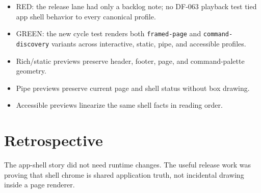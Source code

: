 \begin{itemize}
\tightlist
\item
  RED: the release lane had only a backlog note; no DF-063 playback test tied app shell behavior to every canonical profile.
\item
  GREEN: the new cycle test renders both \texttt{f\allowbreak{}r\allowbreak{}a\allowbreak{}m\allowbreak{}e\allowbreak{}d\allowbreak{}-\allowbreak{}p\allowbreak{}a\allowbreak{}g\allowbreak{}e} and \texttt{c\allowbreak{}o\allowbreak{}m\allowbreak{}m\allowbreak{}a\allowbreak{}n\allowbreak{}d\allowbreak{}-\allowbreak{}d\allowbreak{}i\allowbreak{}s\allowbreak{}c\allowbreak{}o\allowbreak{}v\allowbreak{}e\allowbreak{}r\allowbreak{}y} variants across interactive, static, pipe, and accessible profiles.
\item
  Rich/static previews preserve header, footer, page, and command-palette geometry.
\item
  Pipe previews preserve current page and shell status without box drawing.
\item
  Accessible previews linearize the same shell facts in reading order.
\end{itemize}

\section{Retrospective}\label{record-104-retrospective}

The app-shell story did not need runtime changes. The useful release work was proving that shell chrome is shared application truth, not incidental drawing inside a page renderer.

